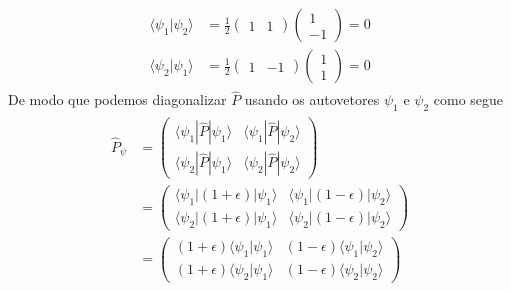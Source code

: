 \begin{prob}
\begin{sol}
\begin{enumerate}[label=\alph *)]
						\begin{align}
							\begin{split}
								\langle{\psi_{1}}|{\psi_{2}}\rangle &= \frac{1}{2}
								\begin{pmatrix}
									1 & 1
								\end{pmatrix}
								\begin{pmatrix}
									1 \\
									-1
								\end{pmatrix} = 0\\
								\langle{\psi_{2}}|{\psi_{1}}\rangle &= \frac{1}{2}
								\begin{pmatrix}
									1 & -1
								\end{pmatrix}
								\begin{pmatrix}
									1 \\
									1
								\end{pmatrix} = 0
							\end{split}
						\end{align}
						De modo que podemos diagonalizar $\hat{P}$ usando os autovetores $\psi_{1}$ e $\psi_{2}$ como segue
						\begin{align}
							\begin{split}
								\hat{P}_{\psi} &=
								\begin{pmatrix}
									\langle{\psi_{1}}|\hat{P}|{\psi_{1}}\rangle &	\langle{\psi_{1}}|\hat{P}|{\psi_{2}}\rangle \\
									\langle{\psi_{2}}|\hat{P}|{\psi_{1}}\rangle &	\langle{\psi_{2}}|\hat{P}|{\psi_{2}}\rangle
								\end{pmatrix}\\
												&=
								\begin{pmatrix}
									\langle{\psi_{1}}|(1+\epsilon)|{\psi_{1}}\rangle &	\langle{\psi_{1}}|(1-\epsilon)|{\psi_{2}}\rangle \\
									\langle{\psi_{2}}|(1+\epsilon)|{\psi_{1}}\rangle &	\langle{\psi_{2}}|(1-\epsilon)|{\psi_{2}}\rangle
								\end{pmatrix}\\
												&=
								\begin{pmatrix}
									(1+\epsilon)\langle{\psi_{1}}|{\psi_{1}}\rangle &	(1-\epsilon)\langle{\psi_{1}}|{\psi_{2}}\rangle \\
									(1+\epsilon)\langle{\psi_{2}}|{\psi_{1}}\rangle &	(1-\epsilon)\langle{\psi_{2}}|{\psi_{2}}\rangle
								\end{pmatrix}\\

\end{split}
\end{align}
\end{enumerate}
\end{sol}
\end{prob}
